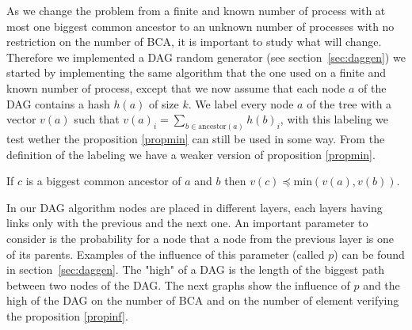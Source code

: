 As we change the problem from a finite and known number of process with at most one biggest common ancestor to an unknown number of processes with no restriction on the number of BCA, it is important to study what will change. Therefore we implemented a DAG random generator (see section~\ref{sec:daggen}) we started by implementing the same algorithm that the one used on a finite and known number of process, except that we now assume that each node $a$ of the DAG contains a hash $h(a)$ of size $k$. We label every node $a$ of the tree with a vector $v(a)$ such that $v(a)_i=\sum_{b\in \mathrm{ancestor}(a)} h(b)_i$, with this labeling we test wether the proposition \ref{propmin} can still be used in some way. From the definition of the labeling we have a weaker version of proposition \ref{propmin}.
\begin{proposition}
 If $c$ is a biggest common ancestor of $a$ and $b$ then $v(c) \preccurlyeq \mathrm{min}(v(a),v(b))$. \label{propinf}
\end{proposition}
In our DAG algorithm nodes are placed in different layers, each layers having links only with the previous and the next one. An important parameter to consider is the probability for a node that a node from the previous layer is one of its parents. Examples of the influence of this parameter (called $p$) can be found in section~\ref{sec:daggen}. The "high" of a DAG is the length of the biggest path between two nodes of the DAG. The next graphs show the influence of $p$ and the high of the DAG on the number of BCA and on the number of element verifying the proposition \ref{propinf}.
